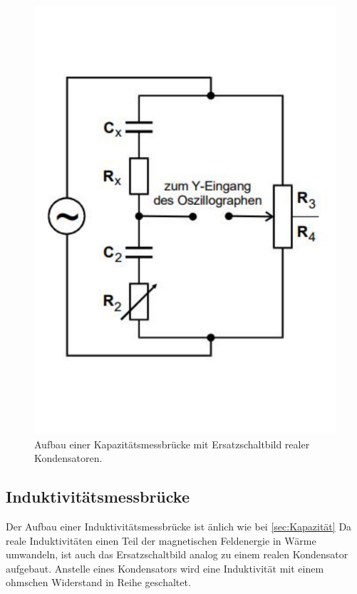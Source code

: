 \begin{figure}
    \centering
    \includegraphics[width=\textwidth]{KapBruecke.pdf}
    \caption{Aufbau einer Kapazitätsmessbrücke mit Ersatzschaltbild realer Kondensatoren.\cite{anleitung}}
\end{figure}

\subsection{Induktivitätsmessbrücke}
\label{sec:Induktivität}

Der Aufbau einer Induktivitätsmessbrücke ist änlich wie bei \ref{sec:Kapazität} 
Da reale Induktivitäten einen Teil der magnetischen Feldenergie in Wärme umwandeln, ist auch das Ersatzschaltbild analog zu einem realen Kondensator aufgebaut.
Anstelle eines Kondensators wird eine Induktivität mit einem ohmschen Widerstand in Reihe geschaltet.

